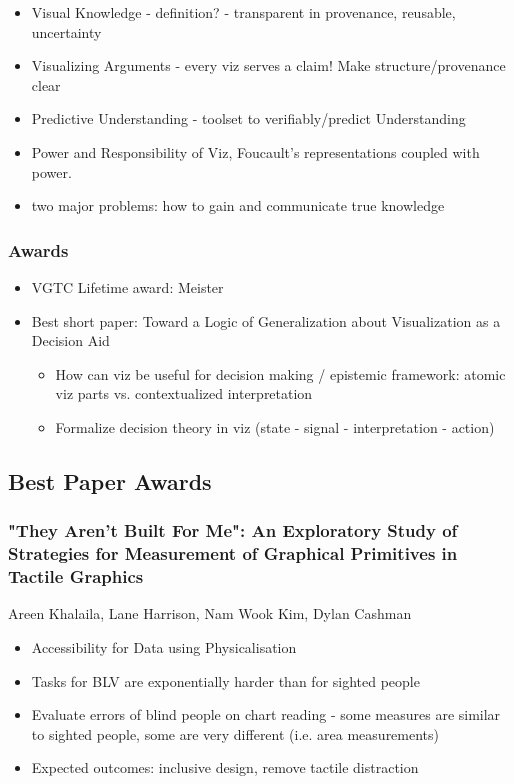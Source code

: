 \documentclass[a4paper]{article}
\begin{document}
\begin{itemize}
\begin{itemize}
\begin{enumerate}
                        \item Normative guardrails: ethics of epistemic-ness, power, fairness?
                    \end{enumerate}
              \item Visual Knowledge - definition? - transparent in provenance, reusable, uncertainty
              \item Visualizing Arguments - every viz serves a claim! Make structure/provenance clear
              \item Predictive Understanding - toolset to verifiably/predict Understanding
              \item Power and Responsibility of Viz, Foucault's representations coupled with power.
              \item two major problems: how to gain and communicate true knowledge


          \end{itemize}

\end{itemize}
\subsubsection{Awards}
\begin{itemize}
    \item VGTC Lifetime award: Meister
    \item Best short paper: Toward a Logic of Generalization about Visualization as a Decision Aid
          \begin{itemize}
              \item How can viz be useful for decision making / epistemic framework: atomic viz parts vs. contextualized interpretation
              \item Formalize decision theory in viz (state - signal - interpretation - action)
          \end{itemize}
\end{itemize}

\subsection{Best Paper Awards}
\subsubsection{"They Aren't Built For Me": An Exploratory Study of Strategies for Measurement of Graphical Primitives in Tactile Graphics}
Areen Khalaila, Lane Harrison, Nam Wook Kim, Dylan Cashman
\begin{itemize}
    \item Accessibility for Data using Physicalisation
    \item Tasks for BLV are exponentially harder than for sighted people
    \item Evaluate errors of blind people on chart reading - some measures are similar to sighted people, some are very different (i.e. area measurements)
    \item Expected outcomes: inclusive design, remove tactile distraction
\end{itemize}
\end{document}
